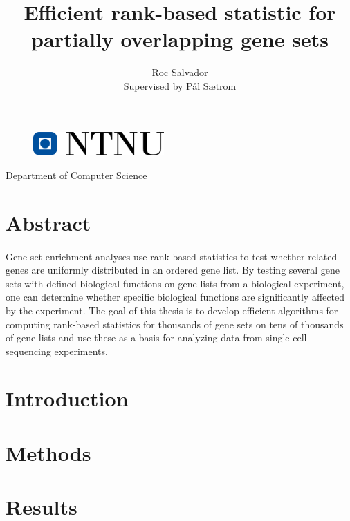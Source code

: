 \documentclass[12pt]{extarticle}
\begin{document}
\author{Roc Salvador \\ Supervised by Pål Sætrom}

\title{\bfseries Efficient rank-based statistic for partially overlapping gene sets}

\maketitle


\vspace{10cm}

\begin{figure}[H]
    \centering
    \includegraphics[width=5cm]{img/ntnu.png}
\end{figure}

\begin{center}

Department of Computer Science

\end{center}


\newpage

\tableofcontents

\newpage


\section{Abstract}

\paragraph{} Gene set enrichment analyses use rank-based statistics to test whether related genes are uniformly distributed in an ordered gene list. By testing several gene sets with defined biological functions on gene lists from a biological experiment, one can determine whether specific biological functions are significantly affected by the experiment. The goal of this thesis is to develop efficient algorithms for computing rank-based statistics for thousands of gene sets on tens of thousands of gene lists and use these as a basis for analyzing data from single-cell sequencing experiments.

\newpage

\section{Introduction}

\newpage

\section{Methods}

\newpage

\section{Results}
\end{document}
